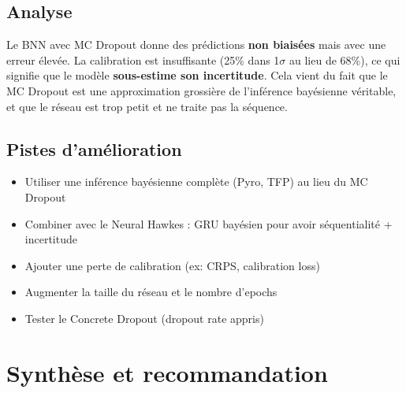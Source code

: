 \documentclass[11pt,a4paper]{article}
\begin{document}
\subsection{Analyse}
Le BNN avec MC Dropout donne des prédictions \textbf{non biaisées} mais avec une erreur 
élevée. La calibration est insuffisante (25\% dans 1$\sigma$ au lieu de 68\%), 
ce qui signifie que le modèle \textbf{sous-estime son incertitude}. 
Cela vient du fait que le MC Dropout est une approximation grossière de l'inférence 
bayésienne véritable, et que le réseau est trop petit et ne traite pas la séquence.

\subsection{Pistes d'amélioration}
\begin{itemize}[noitemsep]
  \item Utiliser une inférence bayésienne complète (Pyro, TFP) au lieu du MC Dropout
  \item Combiner avec le Neural Hawkes : GRU bayésien pour avoir séquentialité + incertitude
  \item Ajouter une perte de calibration (ex: CRPS, calibration loss)
  \item Augmenter la taille du réseau et le nombre d'epochs
  \item Tester le Concrete Dropout (dropout rate appris)
\end{itemize}

\newpage
\section{Synthèse et recommandation}
\end{document}
